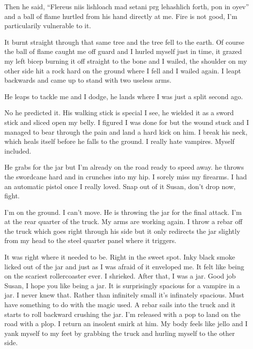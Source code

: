 Then he said, ``Flereus niis lishloach mad setani prg lehashlich forth, pon in oyev'' and a ball of flame hurtled from his hand directly at me. Fire is not good, I'm particularily vulnerable to it.

It burnt straight through that same tree and the tree fell to the earth. Of course the ball of flame caught me off guard and I hurled myself just in time, it grazed my left bicep burning it off straight to the bone and I wailed, the shoulder on my other side hit a rock hard on the ground where I fell and I wailed again. I leapt backwards and came up to stand with two useless arms.

He leaps to tackle me and I dodge, he lands where I was just a split second ago.

No he predicted it. His walking stick is special I see, he wielded it as a sword stick and sliced open my belly. I figured I was done for but the wound stuck and I managed to bear through the pain and land a hard kick on him. I break his neck, which heals itself before he falls to the ground. I really hate vampires. Myself included.

He grabs for the jar but I'm already on the road ready to speed away. he throws the swordcane hard and in crunches into my hip. I sorely miss my firearms. I had an automatic pistol once I really loved. Snap out of it Susan, don't drop now, fight.

I'm on the ground. I can't move. He is throwing the jar for the final attack. I'm at the rear quarter of the truck. My arms are working again. I throw a rebar off the truck which goes right through his side but it only redirects the jar slightly from my head to the steel quarter panel where it triggers.

It was right where it needed to be. Right in the sweet spot. Inky black smoke licked out of the jar and just as I was afraid of it enveloped me. It felt like being on the scariest rollercoaster ever. I shrieked. After that, I was a jar. Good job Susan, I hope you like being a jar. It is surprisingly spacious for a vampire in a jar. I never knew that. Rather than infinitely small it's infinately spacious. Must have something to do with the magic used. A rebar sails into the truck and it starts to roll backward crushing the jar. I'm released with a pop to land on the road with a plop. I return an insolent smirk at him. My body feels like jello and I yank myself to my feet by grabbing the truck and hurling myself to the other side.

